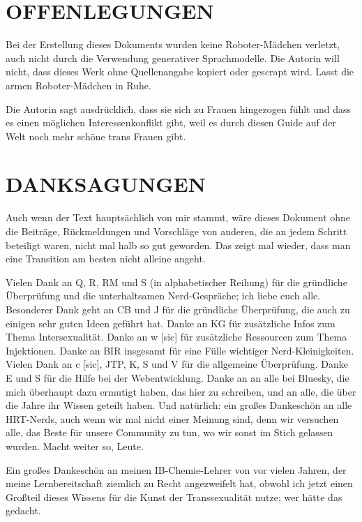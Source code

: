 \documentclass{article}
\begin{document}
\section*{OFFENLEGUNGEN}

Bei der Erstellung dieses Dokuments wurden keine Roboter-Mädchen verletzt, auch nicht durch die Verwendung generativer Sprachmodelle. Die Autorin will nicht, dass dieses Werk ohne Quellenangabe kopiert oder gescrapt wird. Lasst die armen Roboter-Mädchen in Ruhe.

Die Autorin sagt ausdrücklich, dass sie sich zu Frauen hingezogen fühlt und dass es einen möglichen Interessenkonflikt gibt, weil es durch diesen Guide auf der Welt noch mehr schöne trans Frauen gibt.

 

\section*{DANKSAGUNGEN}

Auch wenn der Text hauptsächlich von mir stammt, wäre dieses Dokument ohne die Beiträge, Rückmeldungen und Vorschläge von anderen, die an jedem Schritt beteiligt waren, nicht mal halb so gut geworden. Das zeigt mal wieder, dass man eine Transition  am besten nicht alleine angeht.

Vielen Dank an Q, R, RM und S (in alphabetischer Reihung) für die gründliche Überprüfung und die unterhaltsamen Nerd-Gespräche; ich liebe euch alle. Besonderer Dank geht an CB und J für die gründliche Überprüfung, die auch zu einigen sehr guten Ideen geführt hat. Danke an KG für zusätzliche Infos zum Thema Intersexualität. Danke an w [sic] für zusätzliche Ressourcen zum Thema Injektionen. Danke an BIR insgesamt für eine Fülle wichtiger Nerd-Kleinigkeiten. Vielen Dank an c [sic], JTP, K, S und V für die allgemeine Überprüfung. Danke E und S für die Hilfe bei der Webentwicklung. Danke an an alle bei Bluesky, die mich überhaupt dazu ermutigt haben, das hier zu schreiben, und an alle, die über die Jahre ihr Wissen geteilt haben. Und natürlich: ein großes Dankeschön an alle HRT-Nerds, auch wenn wir mal nicht einer Meinung sind, denn wir versuchen alle, das Beste für unsere Community zu tun, wo wir sonst im Stich gelassen wurden. Macht weiter so, Leute.

Ein großes Dankeschön an meinen IB-Chemie-Lehrer von vor vielen Jahren, der meine Lernbereitschaft ziemlich zu Recht angezweifelt hat, obwohl ich jetzt einen Großteil dieses Wissens für die Kunst der Transsexualität nutze; wer hätte das gedacht.
\end{document}
